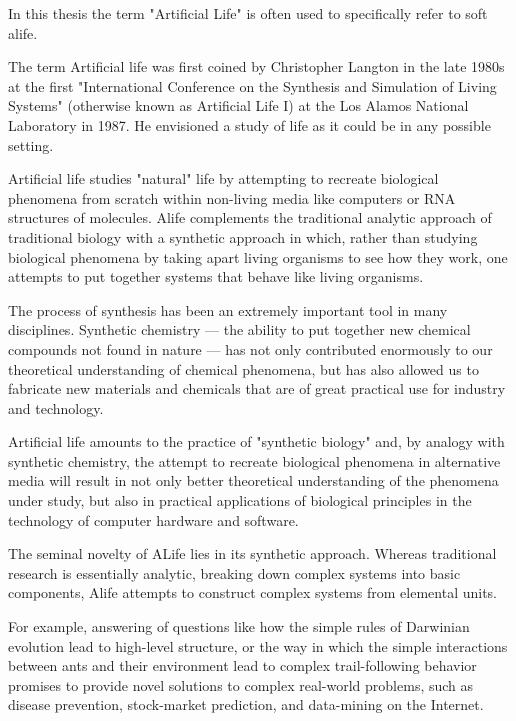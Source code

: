 \documentclass[a4paper,12pt]{report}
\begin{document}
In this thesis the term "Artificial Life" is often used to specifically refer to soft alife.

The term Artificial life was first coined by Christopher Langton in the late 1980s at the first "International Conference on the Synthesis and Simulation of Living Systems" (otherwise known as Artificial Life I) at the Los Alamos National Laboratory in 1987. He envisioned a study of life as it could be in any possible setting.

Artificial life studies "natural" life by attempting to recreate biological phenomena from scratch within non-living media like computers or RNA structures of molecules. Alife complements the traditional analytic approach of traditional biology with a synthetic approach in which, rather than studying biological phenomena by taking apart living organisms to see how they work, one attempts to put together systems that behave like living organisms.

The process of synthesis has been an extremely important tool in many disciplines. Synthetic chemistry --- the ability to put together new chemical compounds not found in nature --- has not only contributed enormously to our theoretical understanding of chemical phenomena, but has also allowed us to fabricate new materials and chemicals that are of great practical use for industry and technology.

Artificial life amounts to the practice of "synthetic biology" and, by analogy with synthetic chemistry, the attempt to recreate biological phenomena in alternative media will result in not only better theoretical understanding of the phenomena under study, but also in practical applications of biological principles in the technology of computer hardware and software.\cite{Langton} 

The seminal novelty of ALife lies in its synthetic approach. Whereas traditional research is essentially analytic, breaking down complex systems into basic components, Alife attempts to construct complex systems from elemental units.\cite{BornhoffenLataud}

For example, answering of questions like how the simple rules of Darwinian evolution lead to high-level structure, or the way in which the simple interactions between ants and their environment lead to complex trail-following behavior promises to provide novel solutions to complex real-world problems, such as disease prevention, stock-market prediction, and data-mining on the Internet.\cite{AdamiBrown}
\end{document}
